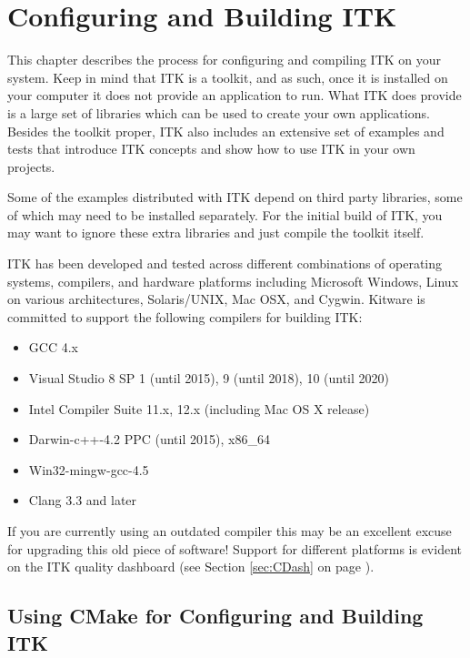 \chapter{Configuring and Building ITK}
\label{chapter:Installation}

This chapter describes the process for configuring and compiling ITK on your
system. Keep in mind that ITK is a toolkit, and as such, once it is installed
on your computer it does not provide an application to run. What ITK does
provide is a large set of libraries which can be used to create your own
applications. Besides the toolkit proper, ITK also includes an extensive set of
examples and tests that introduce ITK concepts and show how to use ITK in your
own projects.

Some of the examples distributed with ITK depend on third party libraries, some
of which may need to be installed separately. For the initial build of ITK, you
may want to ignore these extra libraries and just compile the toolkit itself.

ITK has been developed and tested across different combinations of operating
systems, compilers, and hardware platforms including Microsoft Windows, Linux on
various architectures, Solaris/UNIX, Mac OSX, and Cygwin. Kitware is committed
to support the following compilers for building ITK:


\begin{itemize}
\item GCC 4.x
\item Visual Studio 8 SP 1 (until 2015), 9 (until 2018), 10 (until 2020)
\item Intel Compiler Suite 11.x, 12.x (including Mac OS X release)
\item Darwin-c++-4.2 PPC (until 2015), x86\_64
\item Win32-mingw-gcc-4.5
\item Clang 3.3 and later
\end{itemize}

If you are currently using an outdated compiler this may be an excellent excuse
for upgrading this old piece of software! Support for different platforms is
evident on the ITK quality dashboard (see Section \ref{sec:CDash} on page
\pageref{sec:CDash}).

\section{Using CMake for Configuring and Building ITK}

